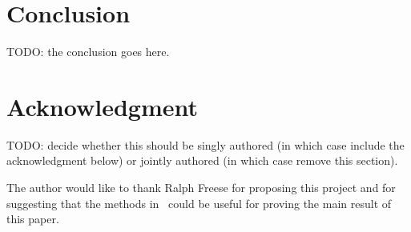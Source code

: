 



\section{Conclusion}
TODO: the conclusion goes here.






\section*{Acknowledgment}
TODO: decide whether this should be singly authored (in which case
include the acknowledgment below) or jointly authored (in which case 
remove this section).

The author would like to thank Ralph Freese for proposing this project and for
suggesting that the methods in~\cite{MR3239624} could be 
useful for proving the main result of this paper.



%
%
%

